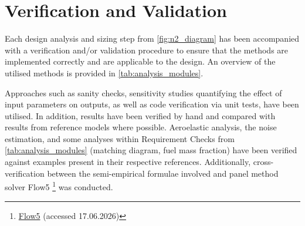 \section{Verification and Validation}
\label{sec:VnV}


Each design analysis and sizing step from \autoref{fig:n2_diagram} has been accompanied with a verification and/or validation procedure to ensure that the methods are implemented correctly and are applicable to the design. An overview of the utilised methods is provided in \autoref{tab:analysis_modules}. 

Approaches such as sanity checks, sensitivity studies quantifying the effect of input parameters on outputs, as well as code verification via unit tests, have been utilised. In addition, results have been verified by hand and compared with results from reference models where possible. Aeroelastic analysis, the noise estimation, and some analyses within Requirement Checks from \autoref{tab:analysis_modules} (matching diagram, fuel mass fraction) have been verified against examples present in their respective references. Additionally, cross-verification between the semi-empirical formulae involved and panel method solver Flow5 \footnote{\label{foot:flow5}\href{https://flow5.tech/flow5.html}{Flow5} (accessed 17.06.2026)} was conducted.



\small
\renewcommand{\arraystretch}{1.3}

